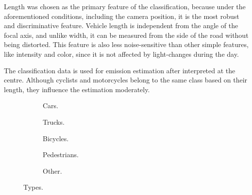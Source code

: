 Length was chosen as the primary feature of the classification, because under the aforementioned conditions, including the camera position, it is the most robust and discriminative feature.
Vehicle length is independent from the angle of the focal axis, and unlike width, it can be measured from the side of the road without being distorted.
This feature is also less noise-sensitive than other simple features, like intensity and color, since it is not affected by light-changes during the day.

The classification data is used for emission estimation after interpreted at the centre.
Although cyclists and motorcycles belong to the same class based on their length, they influence the estimation moderately.

\begin{figure}[!h]
	\centering
	\begin{subfigure}[!h]{0.25\textwidth}
	
	\caption{Cars.}
	\end{subfigure}
	\quad
	\begin{subfigure}[!h]{0.25\textwidth}
	
	\caption{Trucks.}
	\end{subfigure}
	\quad
	\begin{subfigure}[!h]{0.21\textwidth}
	
	\caption{Bicycles.}
	\end{subfigure}
	\hfill
	\begin{subfigure}[!h]{0.3\textwidth}
	
	\caption{Pedestrians.}
	\end{subfigure}
	\quad
	\begin{subfigure}[!h]{0.5\textwidth}
	
	\caption{Other.}
	\end{subfigure}

	\caption{Types.\label{fig:types}}
\end{figure}



